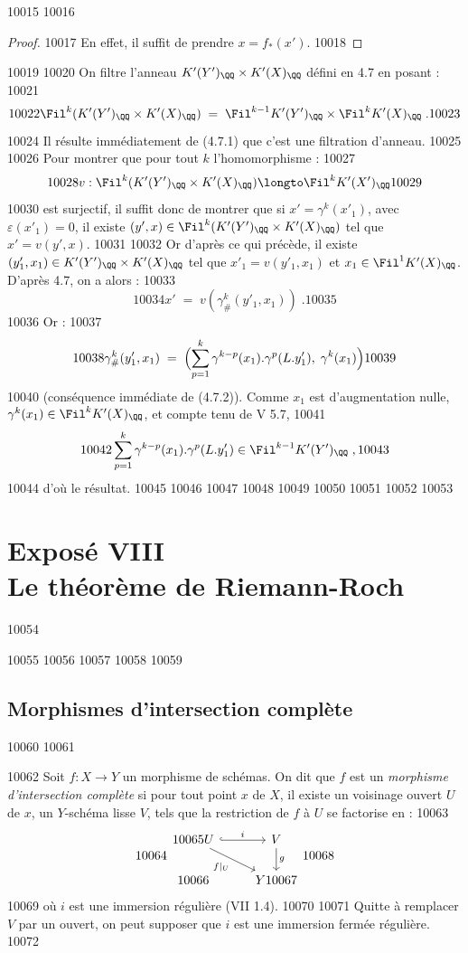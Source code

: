  10015	
 10016	\begin{proof}
 10017	En effet, il suffit de prendre $x = f_*(x')$.
 10018	\end{proof}
 10019	
 10020	On filtre l'anneau $K'(Y')_{\QQ} \times K'(X)_{\QQ}$ défini en 4.7 en posant :
 10021	\[
 10022	\Fil^k(K'(Y')_{\QQ} \times K'(X)_{\QQ}) \; = \; \Fil^{k-1} K'(Y')_{\QQ} \times \Fil^k K'(X)_{\QQ}\; .
 10023	\]
 10024	Il résulte immédiatement de (4.7.1) que c'est une filtration d'anneau.
 10025	
 10026	Pour montrer que pour tout $k$ l'homomorphisme :
 10027	\[
 10028	v : \Fil^k(K'(Y')_{\QQ} \times K'(X)_{\QQ}) \longto \Fil^k K'(X')_{\QQ}
 10029	\]
 10030	est surjectif, il suffit donc de montrer que si $x' = \gamma^k(x'_1)$, avec $\varepsilon(x'_1) = 0$, il existe $(y',x) \in \Fil^k(K'(Y')_{\QQ} \times K'(X)_{\QQ})$ tel que $x' = v(y',x)$.
 10031	
 10032	Or d'après ce qui précède, il existe $(y'_1, x_1) \in K'(Y')_{\QQ} \times K'(X)_{\QQ}$ tel que $x'_1 = v(y'_1, x_1)$ et $x_1 \in \Fil^1 K'(X)_{\QQ}$. D'après 4.7, on a alors :
 10033	\[
 10034	x' \; = \; v(\gamma^k_{\#}(y'_1, x_1))\; .
 10035	\]
 10036	Or :
 10037	\[
 10038	\gamma^k_{\#}(y'_1, x_1) \; = \; \Bigl(\sum_{p=1}^{k} \gamma^{k-p}(x_1).\gamma^p(L.y'_1),\; \gamma^k(x_1)\Bigr)
 10039	\]
 10040	(conséquence immédiate de (4.7.2)). Comme $x_1$ est d'augmentation nulle, $\gamma^k(x_1) \in \Fil^k K'(X)_{\QQ}$, et compte tenu de V 5.7,
 10041	\[
 10042	\sum_{p=1}^{k} \gamma^{k-p}(x_1).\gamma^p(L.y'_1) \in \Fil^{k-1} K'(Y')_{\QQ}\; ,
 10043	\]
 10044	d'où le résultat.
 10045	
 10046	
 10047	
 10048	%
 10049	%
 10050	%
 10051	%
 10052	
 10053	\chapter*{Exposé VIII\\Le théorème de Riemann-Roch}
 10054	
 10055	
 10056	\setcounter{section}{0}
 10057	\setcounter{proposition}{0}
 10058	
 10059	\section{Morphismes d'intersection complète}
 10060	
 10061	\begin{definition}[1.1]%
 10062	Soit $f : X \to Y$ un morphisme de schémas. On dit que $f$ est un \emph{morphisme d'intersection complète} si pour tout point $x$ de $X$, il existe un voisinage ouvert $U$ de $x$, un $Y$-schéma lisse $V$, tels que la restriction de $f$ à $U$ se factorise en :
 10063	\[
 10064	\begin{tikzcd}
 10065	U \arrow[r, hook, "i"] \arrow[dr, "f|_U"'] & V \arrow[d, "g"] \\
 10066	& Y
 10067	\end{tikzcd}
 10068	\]
 10069	où $i$ est une immersion régulière (VII 1.4).
 10070	
 10071	Quitte à remplacer $V$ par un ouvert, on peut supposer que $i$ est une immersion fermée régulière.
 10072	\end{definition}
